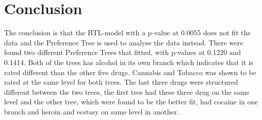 \section*{Conclusion}
\label{Conclusion}
%
The conclusion is that the BTL-model with a p-value at 0.0055 does not fit the data and the Preference Tree is used to analyse the data instead. There were found two different Preference Trees that fitted, with p-values at 0.1220 and 0.1414. Both of the trees has alcohol in its own branch which indicates that it is rated different than the other five drugs. Cannabis and Tobacco was shown to be rated at the same level for both trees. The last three drugs were structured different between the two trees, the first tree had these three drug on the same level and the other tree, which were found to be the better fit, had cocaine in one branch and heroin and ecstasy on same level in another. 